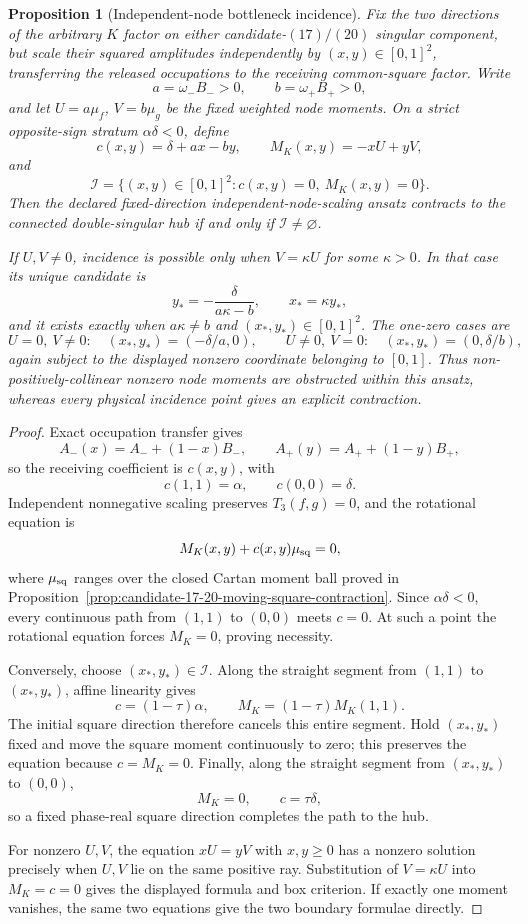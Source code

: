 \documentclass[11pt]{article}
\newtheorem{proposition}[theorem]{Proposition}
\theoremstyle{definition}
\theoremstyle{remark}
\begin{document}
\begin{proposition}[Independent-node bottleneck incidence]
\label{prop:candidate-17-20-independent-node-scaling}
Fix the two directions of the arbitrary \(K\) factor on either
candidate-\((17)/(20)\) singular component, but scale their squared
amplitudes independently by \((x,y)\in[0,1]^2\), transferring the released
occupations to the receiving common-square factor.  Write
\[
 a=\omega_-B_->0,\qquad b=\omega_+B_+>0,
\]
and let \(U=a\mu_f\), \(V=b\mu_g\) be the fixed weighted node moments.  On a
strict opposite-sign stratum \(\alpha\delta<0\), define
\[
 c(x,y)=\delta+ax-by,\qquad
 M_K(x,y)=-xU+yV,
\]
and
\[
 \mathcal I=\{(x,y)\in[0,1]^2:c(x,y)=0,\ M_K(x,y)=0\}.
\]
Then the declared fixed-direction independent-node-scaling ansatz contracts
to the connected double-singular hub if and only if
\(\mathcal I\neq\varnothing\).

If \(U,V\neq0\), incidence is possible only when
\(V=\kappa U\) for some \(\kappa>0\).  In that case its unique candidate is
\[
 y_*=-\frac{\delta}{a\kappa-b},
 \qquad x_*=\kappa y_*,
\]
and it exists exactly when \(a\kappa\neq b\) and
\((x_*,y_*)\in[0,1]^2\).  The one-zero cases are
\[
 U=0,\ V\neq0:\quad (x_*,y_*)=(-\delta/a,0),
 \qquad
 U\neq0,\ V=0:\quad (x_*,y_*)=(0,\delta/b),
\]
again subject to the displayed nonzero coordinate belonging to \([0,1]\).
Thus non-positively-collinear nonzero node moments are obstructed within
this ansatz, whereas every physical incidence point gives an explicit
contraction.
\end{proposition}

\begin{proof}
Exact occupation transfer gives
\[
 A_-(x)=A_-+(1-x)B_-,
 \qquad
 A_+(y)=A_++(1-y)B_+,
\]
so the receiving coefficient is \(c(x,y)\), with
\[
 c(1,1)=\alpha,\qquad c(0,0)=\delta.
\]
Independent nonnegative scaling preserves \(T_3(f,g)=0\), and the rotational
equation is
\[
 M_K(x,y)+c(x,y)\mu_{\rm sq}=0,
\]
where \(\mu_{\rm sq}\) ranges over the closed Cartan moment ball proved in
Proposition~\ref{prop:candidate-17-20-moving-square-contraction}.
Since \(\alpha\delta<0\), every continuous path from \((1,1)\) to
\((0,0)\) meets \(c=0\).  At such a point the rotational equation forces
\(M_K=0\), proving necessity.

Conversely, choose \((x_*,y_*)\in\mathcal I\).  Along the straight segment
from \((1,1)\) to \((x_*,y_*)\), affine linearity gives
\[
 c=(1-\tau)\alpha,\qquad
 M_K=(1-\tau)M_K(1,1).
\]
The initial square direction therefore cancels this entire segment.  Hold
\((x_*,y_*)\) fixed and move the square moment continuously to zero; this
preserves the equation because \(c=M_K=0\).  Finally, along the straight
segment from \((x_*,y_*)\) to \((0,0)\),
\[
 M_K=0,\qquad c=\tau\delta,
\]
so a fixed phase-real square direction completes the path to the hub.

For nonzero \(U,V\), the equation \(xU=yV\) with \(x,y\geq0\) has a nonzero
solution precisely when \(U,V\) lie on the same positive ray.  Substitution
of \(V=\kappa U\) into \(M_K=c=0\) gives the displayed formula and box
criterion.  If exactly one moment vanishes, the same two equations give the
two boundary formulae directly.
\end{proof}
\end{document}

